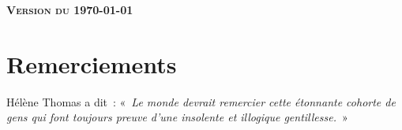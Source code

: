 \documentclass[12pt]{report}
\begin{document}
\setlength{\parindent}{0pt}
\renewcommand\labelitemii{\ding{220}}
\begin{titlepage}

\end{titlepage}

\newpage

\begin{center}

\vspace{0.5cm} 

\vspace{0.5cm}


\end{center}
\vspace{6cm}

\LARGE
\begin{center}
\LARGE

\textbf{\textsc{Version du \today}}\\

\end{center}

\vspace{12.0cm}

\normalsize

	









\fancyhf{} \fancyfoot[LE,RO]{\bfseries\thepage}

\renewcommand{\headrulewidth}{0.5pt}
\addtolength{\headheight}{0.5pt}
\renewcommand{\footrulewidth}{0pt}
\fancypagestyle{plain}{ \fancyhead{}
\renewcommand{\headrulewidth}{0pt}}

\thispagestyle{empty}
\setcounter{page}{0}
\null

\pagestyle{plain}
 


\thispagestyle{empty}
\setcounter{page}{0}
\null
\thispagestyle{empty}
\chapter*{Remerciements} 
\thispagestyle{empty}
 \setcounter{page}{1} 


Hélène Thomas a dit~: «~\textit{Le monde devrait remercier cette étonnante cohorte de gens qui font toujours preuve d'une insolente et illogique gentillesse.}~» \\
\end{document}
